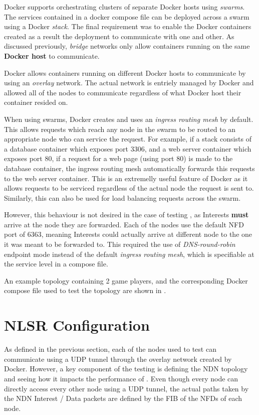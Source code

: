 Docker supports orchestrating clusters of separate Docker hosts using \textit{swarms}. The services contained in a docker compose file can be deployed across a swarm using a Docker \textit{stack}. The final requirement was to enable the Docker containers created as a result the deployment to communicate with one and other. As discussed previously, \textit{bridge} networks only allow containers running on the same \textbf{Docker host} to communicate.

Docker allows containers running on different Docker hosts to communicate by using an \textit{overlay} network. The actual network is entriely managed by Docker and allowed all of the \game{} nodes to communicate regardless of what Docker host their container resided on. 

When using swarms, Docker creates and uses an \textit{ingress routing mesh} by default. This allows requests which reach any node in the swarm to be routed to an appropriate node who can service the request. For example, if a stack consists of a database container which exposes port 3306, and a web server container which exposes port 80, if a request for a web page (using port 80) is made to the database container, the ingress routing mesh automatically forwards this requests to the web server container. This is an extremelly useful feature of Docker as it allows requests to be serviced regardless of the actual node the request is sent to. Similarly, this can also be used for load balancing requests across the swarm.

However, this behaviour is not desired in the case of testing \game{}, as Interests \textbf{must} arrive at the node they are forwarded. Each of the nodes use the default NFD port of 6363, meaning Interests could actually arrive at different node to the one it was meant to be forwarded to. This required the use of \textit{DNS-round-robin} endpoint mode instead of the default \textit{ingress routing mesh}, which is specifiable at the service level in a compose file.

An example topology containing 2 game players, and the corresponding Docker compose file used to test the topology are shown in .



\section{NLSR Configuration}
As defined in the previous section, each of the nodes used to test \game{} can communicate using a UDP tunnel through the overlay network created by Docker. However, a key component of the testing is defining the NDN topology and seeing how it impacts the performance of \game{}. Even though every node can directly access every other node using a UDP tunnel, the actual paths taken by the NDN Interest / Data packets are defined by the FIB of the NFDs of each node. 

